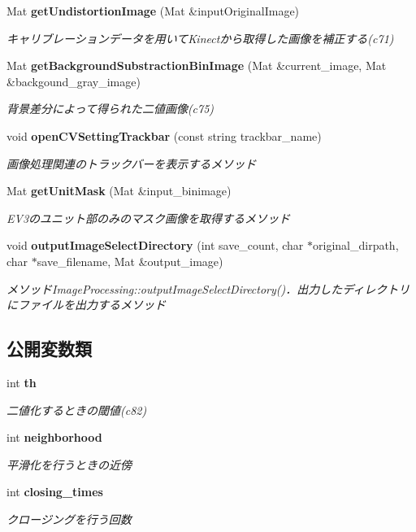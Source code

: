 \begin{DoxyCompactItemize}
Mat {\bf get\-Undistortion\-Image} (Mat \&input\-Original\-Image)
\begin{DoxyCompactList}\small\item\em キャリブレーションデータを用いて\-Kinectから取得した画像を補正する(c71) \end{DoxyCompactList}\item 
Mat {\bf get\-Background\-Substraction\-Bin\-Image} (Mat \&current\-\_\-image, Mat \&backgound\-\_\-gray\-\_\-image)
\begin{DoxyCompactList}\small\item\em 背景差分によって得られた二値画像(c75) \end{DoxyCompactList}\item 
void {\bf open\-C\-V\-Setting\-Trackbar} (const string trackbar\-\_\-name)
\begin{DoxyCompactList}\small\item\em 画像処理関連のトラックバーを表示するメソッド \end{DoxyCompactList}\item 
Mat {\bf get\-Unit\-Mask} (Mat \&input\-\_\-binimage)
\begin{DoxyCompactList}\small\item\em E\-V3のユニット部のみのマスク画像を取得するメソッド \end{DoxyCompactList}\item 
void {\bf output\-Image\-Select\-Directory} (int save\-\_\-count, char $\ast$original\-\_\-dirpath, char $\ast$save\-\_\-filename, Mat \&output\-\_\-image)
\begin{DoxyCompactList}\small\item\em メソッド\-Image\-Processing\-::output\-Image\-Select\-Directory()．出力したディレクトリにファイルを出力するメソッド \end{DoxyCompactList}\end{DoxyCompactItemize}
\subsection*{公開変数類}
\begin{DoxyCompactItemize}
\item 
int {\bf th}
\begin{DoxyCompactList}\small\item\em 二値化するときの閾値(c82) \end{DoxyCompactList}\item 
int {\bf neighborhood}
\begin{DoxyCompactList}\small\item\em 平滑化を行うときの近傍 \end{DoxyCompactList}\item 
int {\bf closing\-\_\-times}
\begin{DoxyCompactList}\small\item\em クロージングを行う回数 \end{DoxyCompactList}\end{DoxyCompactItemize}


